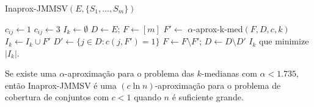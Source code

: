 \begin{algorithm}
    \caption{\sc Inaprox-JMMSV$(E,\{S_1,\ldots,S_m\})$}
    \begin{algorithmic}[1]
            \State $c_{ij} \gets 1$
            \Else
            \State $c_{ij} \gets 3$
            \EndIf
            \EndFor
        \EndFor
            \State $I_k \gets \emptyset$
            \State $D \gets E$; $F \gets [m]$
                \State $F' \gets$ {\sc $\alpha$-aprox-k-med}$(F,D,c,k)$
                \State $I_k \gets I_k \cup F'$
                \State $D' \gets \{j \in D: c(j,F') = 1 \}$
                \State $F \gets F \setminus F'$; $D\gets D\setminus D'$
            \EndWhile
        \EndFor
    \State \Return $I_k$ que minimize $|I_k|$.
    \end{algorithmic}
\end{algorithm}


\begin{theorem}
Se existe uma $\alpha$-aproximação para o problema das $k$-medianas com $\alpha < 1.735$, então {\sc Inaprox-JMMSV} é uma $(c \ln n)$-aproximação para o problema de cobertura de conjuntos com $c<1$ quando $n$ é suficiente grande.
\end{theorem}

